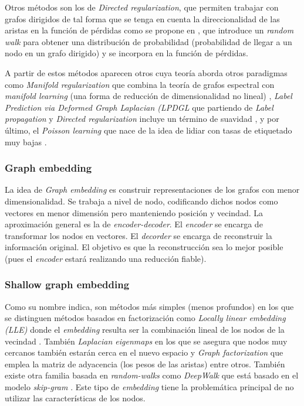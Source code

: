 Otros métodos son los de \textit{Directed regularization}, que permiten trabajar con grafos dirigidos de tal forma que se tenga en cuenta la direccionalidad de las aristas en la función de pérdidas como se propone en \cite{zhou2005learning}, que introduce un \textit{random walk} para obtener una distribución de probabilidad (probabilidad de llegar a un nodo en un grafo dirigido) y se incorpora en la función de pérdidas. 

A partir de estos métodos aparecen otros cuya teoría aborda otros paradigmas como \textit{Manifold regularization} que combina la teoría de grafos espectral con \textit{manifold learning} (una forma de reducción de dimensionalidad no lineal) \cite{belkin2006manifold}, \textit{Label Prediction via Deformed Graph Laplacian (LPDGL} que partiendo de \textit{Label propagation} y \textit{Directed regularization} incluye un término de suavidad \cite{gong2015deformed}, y por último, el \textit{Poisson learning} que nace de la idea de lidiar con tasas de etiquetado muy bajas \cite{calder2020poisson}.

\subsubsection{Graph embedding}

La idea de \textit{Graph embedding} es construir representaciones de los grafos con menor dimensionalidad. Se trabaja a nivel de nodo, codificando dichos nodos como vectores en menor dimensión pero manteniendo posición y vecindad. La aproximación general es la de \textit{encoder-decoder}. El \textit{encoder} se encarga de transformar los nodos en vectores. El \textit{decorder} se encarga de reconstruir la información original. El objetivo es que la reconstrucción sea lo mejor posible (pues el \textit{encoder} estará realizando una reducción fiable).

\subsubsection{Shallow graph embedding}

Como su nombre indica, son métodos más simples (menos profundos) en los que se distinguen métodos basados en factorización como \textit{Locally linear embedding (LLE)} donde el \textit{embedding} resulta ser la combinación lineal de los nodos de la vecindad \cite{roweis2000nonlinear}. También \textit{Laplacian eigenmaps} en los que se asegura que nodos muy cercanos también estarán cerca en el nuevo espacio \cite{belkin2001laplacian} y \textit{Graph factorization} que emplea la matriz de adyacencia (los pesos de las aristas) \cite{ahmed2013distributed} entre otros. También existe otra familia basada en \textit{random-walks} como \textit{DeepWalk} que está basado en el modelo \textit{skip-gram} \cite{perozzi2014deepwalk}. Este tipo de \textit{embedding} tiene la problemática principal de no utilizar las características de los nodos.

